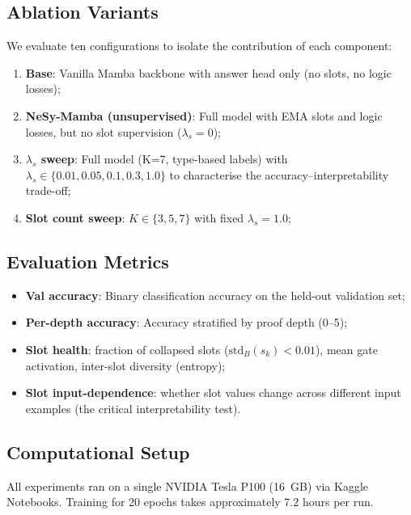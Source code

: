 \documentclass[conference]{IEEEtran}
\begin{document}
\subsection{Ablation Variants}

We evaluate ten configurations to isolate the contribution of
each component:

\begin{enumerate}[nosep]
    \item \textbf{Base}: Vanilla Mamba backbone with answer head
          only (no slots, no logic losses);
    \item \textbf{NeSy-Mamba (unsupervised)}: Full model with EMA
          slots and logic losses, but no slot supervision
          ($\lambda_s = 0$);
    \item \textbf{$\lambda_s$ sweep}: Full model (K=7, type-based
          labels) with $\lambda_s \in \{0.01, 0.05, 0.1, 0.3, 1.0\}$
          to characterise the accuracy--interpretability trade-off;
    \item \textbf{Slot count sweep}: $K \in \{3, 5, 7\}$ with
          fixed $\lambda_s = 1.0$;
\end{enumerate}

\subsection{Evaluation Metrics}

\begin{itemize}[nosep]
    \item \textbf{Val accuracy}: Binary classification accuracy on
          the held-out validation set;
    \item \textbf{Per-depth accuracy}: Accuracy stratified by
          proof depth (0--5);
    \item \textbf{Slot health}: fraction of collapsed slots
          ($\mathrm{std}_B(s_k) < 0.01$), mean gate activation,
          inter-slot diversity (entropy);
    \item \textbf{Slot input-dependence}: whether slot values
          change across different input examples (the critical
          interpretability test).
\end{itemize}

\subsection{Computational Setup}

All experiments ran on a single NVIDIA Tesla P100 (16~GB)
via Kaggle Notebooks. Training for 20 epochs takes approximately
7.2 hours per run.
\end{document}
